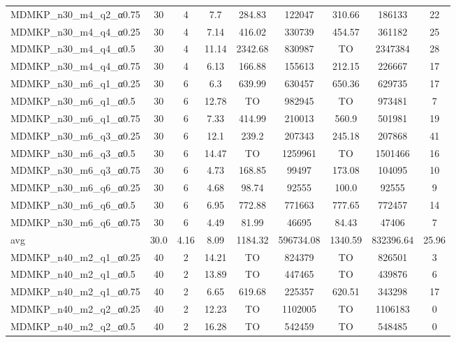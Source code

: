 \begin{table}[!ht]
{\begin{tabular}{lcccccccc}
MDMKP\_n30\_m4\_q2\_α0.75 & 30 & 4 &  \textcolor{blue2}{7.7} & 284.83 & 122047 & 310.66 & 186133 & 22 \\
MDMKP\_n30\_m4\_q4\_α0.25 & 30 & 4 &  \textcolor{blue2}{7.14} & 416.02 & 330739 & 454.57 & 361182 & 25 \\
MDMKP\_n30\_m4\_q4\_α0.5 & 30 & 4 &  \textcolor{blue2}{11.14} & 2342.68 & 830987 & TO & 2347384 & 28 \\
MDMKP\_n30\_m4\_q4\_α0.75 & 30 & 4 &  \textcolor{blue2}{6.13} & 166.88 & 155613 & 212.15 & 226667 & 17 \\
MDMKP\_n30\_m6\_q1\_α0.25 & 30 & 6 &  \textcolor{blue2}{6.3} & 639.99 & 630457 & 650.36 & 629735 & 17 \\
MDMKP\_n30\_m6\_q1\_α0.5 & 30 & 6 &  \textcolor{blue2}{12.78} & TO & 982945 & TO & 973481 & 7 \\
MDMKP\_n30\_m6\_q1\_α0.75 & 30 & 6 &  \textcolor{blue2}{7.33} & 414.99 & 210013 & 560.9 & 501981 & 19 \\
MDMKP\_n30\_m6\_q3\_α0.25 & 30 & 6 &  \textcolor{blue2}{12.1} & 239.2 & 207343 & 245.18 & 207868 & 41 \\
MDMKP\_n30\_m6\_q3\_α0.5 & 30 & 6 &  \textcolor{blue2}{14.47} & TO & 1259961 & TO & 1501466 & 16 \\
MDMKP\_n30\_m6\_q3\_α0.75 & 30 & 6 &  \textcolor{blue2}{4.73} & 168.85 & 99497 & 173.08 & 104095 & 10 \\
MDMKP\_n30\_m6\_q6\_α0.25 & 30 & 6 &  \textcolor{blue2}{4.68} & 98.74 & 92555 & 100.0 & 92555 & 9 \\
MDMKP\_n30\_m6\_q6\_α0.5 & 30 & 6 &  \textcolor{blue2}{6.95} & 772.88 & 771663 & 777.65 & 772457 & 14 \\
MDMKP\_n30\_m6\_q6\_α0.75 & 30 & 6 &  \textcolor{blue2}{4.49} & 81.99 & 46695 & 84.43 & 47406 & 7 \\
\cline{1-9} avg & 30.0 & 4.16 & 8.09 & 1184.32& 596734.08 & 1340.59& 832396.64 & 25.96\\ \cline{1-9}
MDMKP\_n40\_m2\_q1\_α0.25 & 40 & 2 &  \textcolor{blue2}{14.21} & TO & 824379 & TO & 826501 & 3 \\
MDMKP\_n40\_m2\_q1\_α0.5 & 40 & 2 &  \textcolor{blue2}{13.89} & TO & 447465 & TO & 439876 & 6 \\
MDMKP\_n40\_m2\_q1\_α0.75 & 40 & 2 &  \textcolor{blue2}{6.65} & 619.68 & 225357 & 620.51 & 343298 & 17 \\
MDMKP\_n40\_m2\_q2\_α0.25 & 40 & 2 &  \textcolor{blue2}{12.23} & TO & 1102005 & TO & 1106183 & 0 \\
MDMKP\_n40\_m2\_q2\_α0.5 & 40 & 2 &  \textcolor{blue2}{16.28} & TO & 542459 & TO & 548485 & 0 \\

\end{tabular}}
\end{table}
